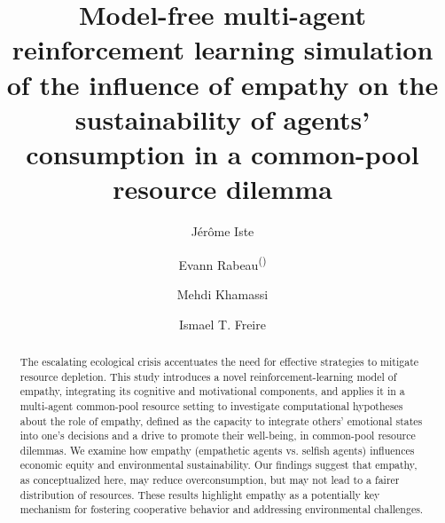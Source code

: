 \documentclass[runningheads]{llncs}
\begin{document}
%
\title{Model-free multi-agent reinforcement learning
simulation of the influence of empathy on the
sustainability of agents' consumption in a
common-pool resource dilemma}
%
%
\author{Jérôme Iste \and
Evann Rabeau\textsuperscript{(\Letter)} \and
Mehdi Khamassi \and
Ismael T. Freire
}
%
%

%
\maketitle              %
%
\begin{abstract}
The escalating ecological crisis accentuates the need for effective strategies to mitigate resource depletion. This study introduces a novel reinforcement-learning model of empathy, integrating its cognitive and motivational components, and applies it in a multi-agent common-pool resource setting to investigate computational hypotheses about the role of empathy, defined as the capacity to integrate others' emotional states into one's decisions and a drive to promote their well-being, in common-pool resource dilemmas. We examine how empathy (empathetic agents vs. selfish agents) influences economic equity and environmental sustainability. Our findings suggest that empathy, as conceptualized here, may reduce overconsumption, but may not lead to a fairer distribution of resources. These results highlight empathy as a potentially key mechanism for fostering cooperative behavior and addressing environmental challenges.

\end{abstract}
%
%
%
\newpage







\newpage

\end{document}

